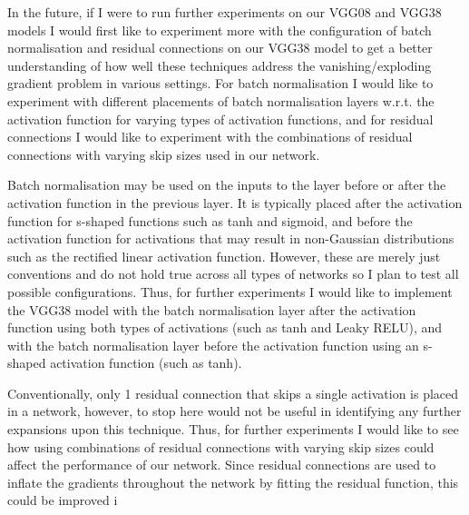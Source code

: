 {{%

In the future, if I were to run further experiments on our VGG08 and VGG38 models I would first like to experiment more with the configuration of batch normalisation and residual connections on our VGG38 model to get a better understanding of how well these techniques address the vanishing/exploding gradient problem in various settings. For batch normalisation I would like to experiment with different placements of batch normalisation layers w.r.t. the activation function for varying types of activation functions, and for residual connections I would like to experiment with the combinations of residual connections with varying skip sizes used in our network.

Batch normalisation may be used on the inputs to the layer before or after the activation function in the previous layer. It is typically placed after the activation function for s-shaped functions such as tanh and sigmoid, and before the activation function for activations that may result in non-Gaussian distributions such as the rectified linear activation function. However, these are merely just conventions and do not hold true across all types of networks so I plan to test all possible configurations. Thus, for further experiments I would like to implement the VGG38 model with the batch normalisation layer after the activation function using both types of activations (such as tanh and Leaky RELU), and with the batch normalisation layer before the activation function using an s-shaped activation function (such as tanh).

Conventionally, only 1 residual connection that skips a single activation is placed in a network, however, to stop here would not be useful in identifying any further expansions upon this technique. Thus, for further experiments I would like to see how using combinations of residual connections with varying skip sizes could affect the performance of our network. Since residual connections are used to inflate the gradients throughout the network by fitting the residual function, this could be improved i

}}

